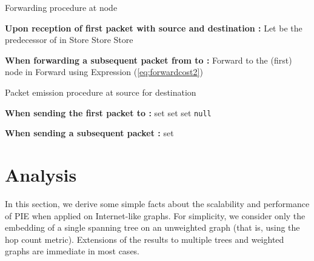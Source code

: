 \documentclass[conference]{IEEEtran}
\begin{document}
\begin{algorithm}[t]
\caption{Forwarding procedure at node }
\begin{algorithmic}
\begin{small}
	\State \textbf{Upon reception of first packet  with source  and destination :}
	\State Let  be the predecessor of  in 
\State 
		\State 
	\EndIf
	\If {}
		\State Store 
			\State Store 
		\EndIf
		\State Store 
	\EndIf
	
	\vspace{0.06in}
	
	\State \textbf{When forwarding a subsequent packet  from  to :}
	\If {}
		\State Forward to the (first) node in 
	\Else
		\State Forward using Expression (\ref{eq:forwardcost2})
	\EndIf
\end{small}
\end{algorithmic}
\label{alg:fwdProcedure}
\end{algorithm}

\begin{algorithm}[t]
\caption{Packet emission procedure at source  for destination }
\begin{algorithmic}
\begin{small}
	\State \textbf{When sending the first packet  to :}
	\State set 
		\State set 
	\Else
		\State set \texttt{null}
	\EndIf
	
	\vspace{0.06in}
	
	\State \textbf{When sending a subsequent packet :}
	\If {}
		\State set 
	\EndIf
	
\end{small}
\end{algorithmic}
\label{alg:sendProcedure}
\end{algorithm}










\section{Analysis}
\label{sec:analysis}

In this section, we derive some simple facts about the scalability and performance of PIE when applied on Internet-like graphs. For simplicity, we consider only the embedding of a single spanning tree  on an unweighted graph (that is, using the hop count metric). Extensions of the results to multiple trees and weighted graphs are immediate in most cases. 
\end{document}

